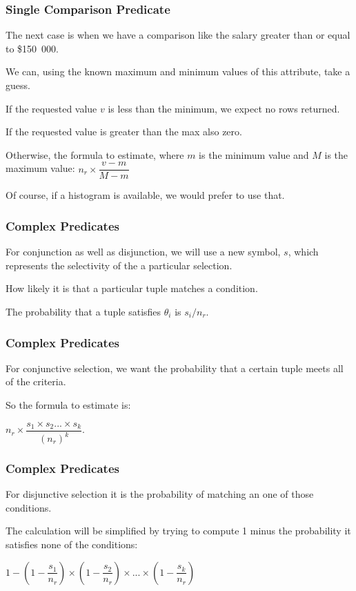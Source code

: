 \begin{frame}
\frametitle{Single Comparison Predicate}

The next case is when we have a comparison like the salary greater than or equal to \$150~000. 

We can, using the known maximum and minimum values of this attribute, take a guess. 

If the requested value $v$ is less than the minimum, we expect no rows returned. 

If the requested value is greater than the max also zero. 

Otherwise, the formula to estimate, where $m$ is the minimum value and $M$ is the maximum value: $n_{r} \times \dfrac{v - m}{M - m}$

Of course, if a histogram is available, we would prefer to use that. 

\end{frame}

\begin{frame}
\frametitle{Complex Predicates}

For conjunction as well as disjunction, we will use a new symbol, $s$, which represents the selectivity of the a particular selection. 

How likely it is that a particular tuple matches a condition. 

The probability that a tuple satisfies $\theta_{i}$ is $s_{i}/n_{r}$.


\end{frame}

\begin{frame}
\frametitle{Complex Predicates}

For conjunctive selection, we want the probability that a certain tuple meets all of the criteria. 

So the formula to estimate is:

$n_{r} \times \dfrac{s_{1} \times s_{2}... \times s_{k}}{(n_{r})^{k}}$.


\end{frame}

\begin{frame}
\frametitle{Complex Predicates}

For disjunctive selection it is the probability of matching an one of those conditions. 

The calculation will be simplified by trying to compute 1 minus the probability it satisfies none of the conditions: 

$1 - (1 - \dfrac{s_{1}}{n_{r}}) \times (1 - \dfrac{s_{2}}{n_{r}}) \times ... \times (1 - \dfrac{s_{k}}{n_{r}})$

\end{frame}


